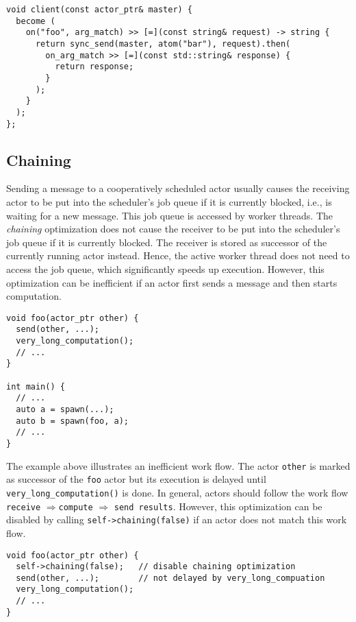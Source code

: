 \begin{lstlisting}
void client(const actor_ptr& master) {
  become (
    on("foo", arg_match) >> [=](const string& request) -> string {
      return sync_send(master, atom("bar"), request).then(
        on_arg_match >> [=](const std::string& response) {
          return response;
        }
      );
    }
  );
};
\end{lstlisting}

\clearpage
\subsection{Chaining}
\label{Sec::Send::ChainedSend}

Sending a message to a cooperatively scheduled actor usually causes the receiving actor to be put into the scheduler's job queue if it is currently blocked, i.e., is waiting for a new message.
This job queue is accessed by worker threads.
The \textit{chaining} optimization does not cause the receiver to be put into the scheduler's job queue if it is currently blocked.
The receiver is stored as successor of the currently running actor instead.
Hence, the active worker thread does not need to access the job queue, which significantly speeds up execution.
However, this optimization can be inefficient if an actor first sends a message and then starts computation.

\begin{lstlisting}
void foo(actor_ptr other) {
  send(other, ...);
  very_long_computation();
  // ...
}

int main() {
  // ...
  auto a = spawn(...);
  auto b = spawn(foo, a);
  // ...
}
\end{lstlisting}

The example above illustrates an inefficient work flow.
The actor \lstinline^other^ is marked as successor of the \lstinline^foo^ actor but its execution is delayed until \lstinline^very_long_computation()^ is done.
In general, actors should follow the work flow \lstinline^receive^ $\Rightarrow$\lstinline^compute^ $\Rightarrow$ \lstinline^send results^.
However, this optimization can be disabled by calling \lstinline^self->chaining(false)^ if an actor does not match this work flow.

\begin{lstlisting}
void foo(actor_ptr other) {
  self->chaining(false);   // disable chaining optimization
  send(other, ...);        // not delayed by very_long_compuation
  very_long_computation();
  // ...
}
\end{lstlisting}

